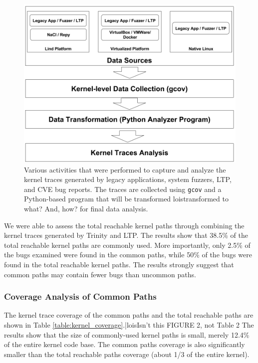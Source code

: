 \begin{figure}%
\centering
\includegraphics[width=1.0\columnwidth]{diagram/data_collection.png}
\caption{Various activities that were performed to capture and analyze the kernel
 traces generated by legacy applications, system fuzzers, LTP, and CVE bug
 reports. The traces are collected using \texttt{gcov} and a Python-based
 program that will be transformed lois{transformed to what? And, how?}
 for final data analysis.}
\label{fig:datacollection}
\end{figure}



We were able to assess
the total reachable kernel paths through combining the kernel traces generated by Trinity and LTP. The results show that 38.5\% of the total reachable
kernel paths are commonly used.
More importantly, only 2.5\% of the bugs examined were found in the common
paths,
while 50\% of the bugs were found in the total reachable kernel paths.
The results strongly suggest that common paths may contain fewer bugs than uncommon
paths. 

\subsubsection{Coverage Analysis of Common Paths}

The kernel trace coverage of the common paths and the total reachable paths
are shown in Table \ref{table:kernel_coverage}.|lois{Isn't this FIGURE 2, not
Table 2}
The results show that the size of commonly-used kernel paths is small,
merely 12.4\% of the entire kernel code base.
The common paths coverage is also significantly smaller than the total
reachable paths coverage
(about 1/3 of the entire kernel).

